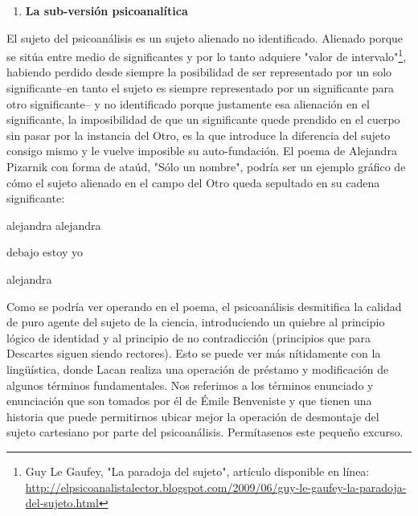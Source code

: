 \documentclass{book}
\begin{document}
\begin{enumerate}
\def\labelenumi{\arabic{enumi}.}
\setcounter{enumi}{1}
\item
  \textbf{La sub-versión psicoanalítica}
\end{enumerate}

El sujeto del psicoanálisis es un sujeto alienado no identificado.
Alienado porque se sitúa entre medio de significantes y por lo tanto
adquiere "valor de intervalo"\footnote{Guy Le Gaufey, "La paradoja del
  sujeto", artículo disponible en línea:
  \url{http://elpsicoanalistalector.blogspot.com/2009/06/guy-le-gaufey-la-paradoja-del-sujeto.html}},
habiendo perdido desde siempre la posibilidad de ser representado por un
solo significante--en tanto el sujeto es siempre representado por un
significante para otro significante-- y no identificado porque
justamente esa alienación en el significante, la imposibilidad de que un
significante quede prendido en el cuerpo sin pasar por la instancia del
Otro, es la que introduce la diferencia del sujeto consigo mismo y le
vuelve imposible su auto-fundación. El poema de Alejandra Pizarnik con
forma de ataúd, "Sólo un nombre", podría ser un ejemplo gráfico de cómo
el sujeto alienado en el campo del Otro queda sepultado en su cadena
significante:

alejandra alejandra

debajo estoy yo

alejandra

Como se podría ver operando en el poema, el psicoanálisis desmitifica la
calidad de puro agente del sujeto de la ciencia, introduciendo un
quiebre al principio lógico de identidad y al principio de no
contradicción (principios que para Descartes siguen siendo rectores).
Esto se puede ver más nítidamente con la lingüística, donde Lacan
realiza una operación de préstamo y modificación de algunos términos
fundamentales. Nos referimos a los términos enunciado y enunciación que
son tomados por él de Émile Benveniste y que tienen una historia que
puede permitirnos ubicar mejor la operación de desmontaje del sujeto
cartesiano por parte del psicoanálisis. Permítasenos este pequeño
excurso.
\end{document}
